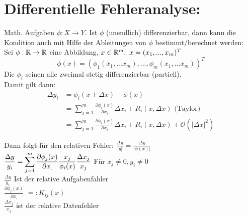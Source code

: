 \section{Differentielle Fehleranalyse:}
Math. Aufgaben $\phi : X \to Y$. Ist $\phi$ (unendlich) differenzierbar, dann kann die Kondition auch mit Hilfe der Ableitungen von $\phi$ bestimmt/berechnet werden:\\
Sei $\phi : \mathbb{R} \to \mathbb{R}$ eine Abbildung, $ x\in\mathbb{R}^m,\ x=(x_1,...,x_m)^T$ \\
    $$\phi(x)=(\phi_1(x_1,...x_m),...,\phi_m(x_1,...x_m))^T$$
    Die $\phi_i$ seinen alle zweimal stetig differenzierbar (partiell).\\
    Damit gilt dann:  \begin{align*}\Delta y_i&=\phi_i(x+\Delta x)-\phi(x)\\
                    &=\sum^m_{j=1}\frac{\partial\phi_i(x)}{\partial x_i}\Delta x_i + R_i(x,\Delta x) \text{ (Taylor)}\\
                    &=\sum^m_{j=1}\frac{\partial\phi_i(x)}{\partial x_i}\Delta x_i + R_i(x,\Delta x) + \mathcal{O}(|\Delta x|^2)
                    \end{align*}

Dann folgt für den relativen Fehler: $\frac{\Delta y}{|y|}=\frac{\Delta y}{|\phi(x)|}$ \\

$\displaystyle\frac{\Delta y}{y_i} = \displaystyle\sum^m_{j=1}\frac{\partial\phi_j(x)}{\partial x_,}\frac{x_j}{\phi_i(x)}\frac{\Delta x_j}{x_j}$ Für $x_j\neq 0 , y_i\neq 0$\\
$\displaystyle\frac{\Delta y}{y_i}$ Ist der relative Aufgabenfahler\\
$\displaystyle\frac{\partial\phi_j(x)}{\partial x_,}$  $=: K_{ij}(x)$\\
$\displaystyle\frac{\Delta x_j}{x_j}$ ist der relative Datenfehler\\


